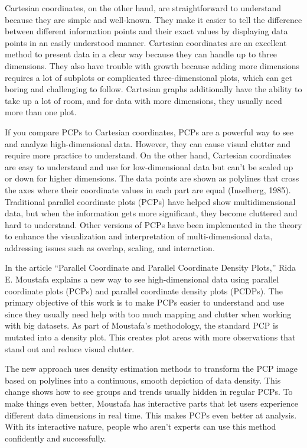 \documentclass[print]{nuthesis}
\begin{document}
Cartesian coordinates, on the other hand, are straightforward to understand because they are simple and well-known.
They make it easier to tell the difference between different information points and their exact values by displaying data points in an easily understood manner.
Cartesian coordinates are an excellent method to present data in a clear way because they can handle up to three dimensions.
They also have trouble with growth because adding more dimensions requires a lot of subplots or complicated three-dimensional plots, which can get boring and challenging to follow.
Cartesian graphs additionally have the ability to take up a lot of room, and for data with more dimensions, they usually need more than one plot.

If you compare PCPs to Cartesian coordinates, PCPs are a powerful way to see and analyze high-dimensional data.
However, they can cause visual clutter and require more practice to understand.
On the other hand, Cartesian coordinates are easy to understand and use for low-dimensional data but can't be scaled up or down for higher dimensions.
The data points are shown as polylines that cross the axes where their coordinate values in each part are equal (Inselberg, 1985).
Traditional parallel coordinate plots (PCPs) have helped show multidimensional data, but when the information gets more significant, they become cluttered and hard to understand.
Other versions of PCPs have been implemented in the theory to enhance the visualization and interpretation of multi-dimensional data, addressing issues such as overlap, scaling, and interaction.

In the article ``Parallel Coordinate and Parallel Coordinate Density Plots,'' Rida E. Moustafa explains a new way to see high-dimensional data using parallel coordinate plots (PCPs) and parallel coordinate density plots (PCDPs).
The primary objective of this work is to make PCPs easier to understand and use since they usually need help with too much mapping and clutter when working with big datasets.
As part of Moustafa's methodology, the standard PCP is mutated into a density plot.
This creates plot areas with more observations that stand out and reduce visual clutter.

The new approach uses density estimation methods to transform the PCP image based on polylines into a continuous, smooth depiction of data density.
This change shows how to see groups and trends usually hidden in regular PCPs.
To make things even better, Moustafa has interactive parts that let users experience different data dimensions in real time.
This makes PCPs even better at analysis. With its interactive nature, people who aren't experts can use this method confidently and successfully.
\end{document}
